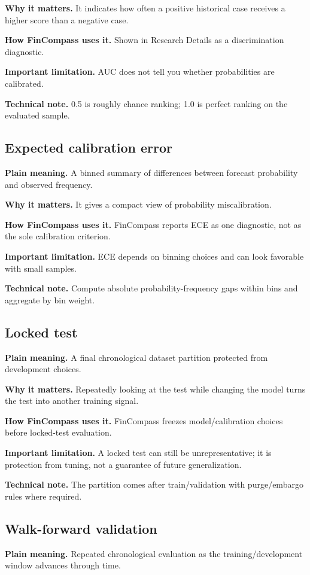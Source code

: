 \documentclass[11pt]{article}
\begin{document}
\textbf{Why it matters.} It indicates how often a positive historical case receives a higher score than a negative case.

\textbf{How FinCompass uses it.} Shown in Research Details as a discrimination diagnostic.

\textbf{Important limitation.} AUC does not tell you whether probabilities are calibrated.

\textbf{Technical note.} 0.5 is roughly chance ranking; 1.0 is perfect ranking on the evaluated sample.

\subsection{Expected calibration error}
\textbf{Plain meaning.} A binned summary of differences between forecast probability and observed frequency.

\textbf{Why it matters.} It gives a compact view of probability miscalibration.

\textbf{How FinCompass uses it.} FinCompass reports ECE as one diagnostic, not as the sole calibration criterion.

\textbf{Important limitation.} ECE depends on binning choices and can look favorable with small samples.

\textbf{Technical note.} Compute absolute probability-frequency gaps within bins and aggregate by bin weight.

\subsection{Locked test}
\textbf{Plain meaning.} A final chronological dataset partition protected from development choices.

\textbf{Why it matters.} Repeatedly looking at the test while changing the model turns the test into another training signal.

\textbf{How FinCompass uses it.} FinCompass freezes model/calibration choices before locked-test evaluation.

\textbf{Important limitation.} A locked test can still be unrepresentative; it is protection from tuning, not a guarantee of future generalization.

\textbf{Technical note.} The partition comes after train/validation with purge/embargo rules where required.

\subsection{Walk-forward validation}
\textbf{Plain meaning.} Repeated chronological evaluation as the training/development window advances through time.
\end{document}
